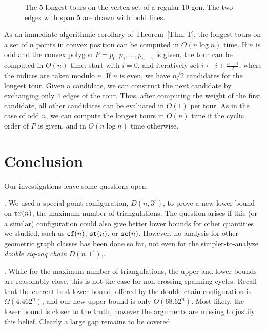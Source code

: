 \documentclass[11pt]{article}
\def\tr{{\tt tr}}
\def\sc{{\tt sc}}
\def\st{{\tt st}}
\def\cf{{\tt cf}}
\begin{document}
\begin{figure}[htbp]
\centerline{\epsfysize=1.2in }
\caption{The 5 longest tours on the vertex set of a regular
  10-gon. The two edges with span $5$ are drawn with bold lines.}
\label{fig:longtour10}
\end{figure}

As an immediate algorithmic corollary of
Theorem~\ref{Thm-T}, the longest tours on a set of $n$
points in convex position can be computed in $O(n \log{n})$ time. 
If $n$ is odd and the convex polygon $P=p_0,p_1,\ldots,p_{n-1}$ is given, 
the tour can be computed in $O(n)$ time: start with $i=0$,
and iteratively set $i \leftarrow i+\frac{n-1}{2}$, where the indices
are taken modulo $n$.
If $n$ is even, we have $n/2$ candidates for the longest tour. 
Given a candidate, we can construct the next candidate by exchanging
only 4 edges of the tour. Thus, after computing the weight of the first candidate,
all other candidates can be evaluated in $O(1)$ per tour.
As in the case of odd $n$, we can compute the longest tours in
$O(n)$ time if the cyclic order of $P$ is given, and in $O(n\log n)$ time otherwise.




\section{Conclusion} \label{sec:conclusion}

Our investigations leave some questions open:

. We used a special point configuration, $D(n,3^r)$, to prove a new lower
bound on $\tr(n)$, the maximum number of triangulations. The question arises if
this (or a similar) configuration could also give better lower bounds for other
quantities we studied, such as $\cf(n)$, $\st(n)$, or $\sc(n)$.
However, no analysis for other geometric graph classes has been done
so far, not even for the simpler-to-analyze \emph{double zig-zag chain} $D(n,1^r)$,.

. While for the maximum number of triangulations, the upper and lower
bounds are reasonably close, this is not the case for non-crossing
spanning cycles. Recall that the current best lower bound, offered
by the double chain configuration is $\Omega(4.462^n)$, and our new upper bound
is only $O(68.62^n)$. Most likely, the lower bound is closer to the
truth, however the arguments are missing to justify this belief.
Clearly a large gap remains to be covered.
\end{document}
